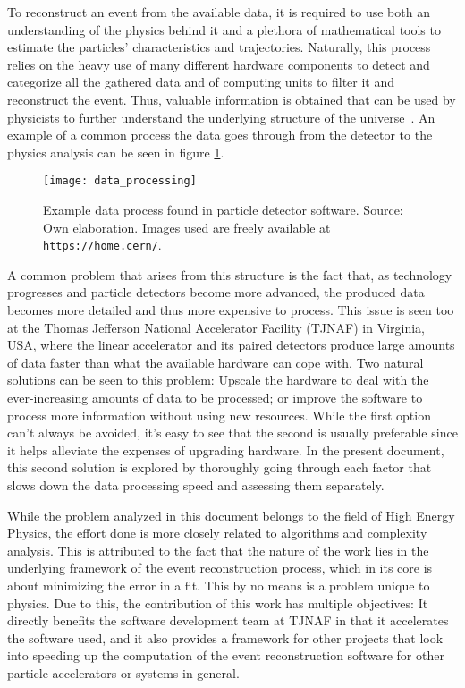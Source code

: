 To reconstruct an event from the available data, it is required to use both an understanding of the physics behind it and a plethora of mathematical tools to estimate the particles' characteristics and trajectories.
Naturally, this process relies on the heavy use of many different hardware components to detect and categorize all the gathered data and of computing units to filter it and reconstruct the event.
Thus, valuable information is obtained that can be used by physicists to further understand the underlying structure of the universe~\cite{sirunyan2017particle}.
An example of a common process the data goes through from the detector to the physics analysis can be seen in figure \ref{fig:data_processing}.

    \begin{figure}[ht]
        \centering
        \texttt{[image: data\_processing]}
        \caption{\label{fig:data_processing} Example data process found in particle detector software. Source: Own elaboration. Images used are freely available at \texttt{https://home.cern/}.}
    \end{figure}

A common problem that arises from this structure is the fact that, as technology progresses and particle detectors become more advanced, the produced data becomes more detailed and thus more expensive to process.
This issue is seen too at the Thomas Jefferson National Accelerator Facility (TJNAF) in Virginia, USA, where the linear accelerator and its paired detectors produce large amounts of data faster than what the available hardware can cope with. %
Two natural solutions can be seen to this problem: Upscale the hardware to deal with the ever-increasing amounts of data to be processed; or improve the software to process more information without using new resources.
While the first option can't always be avoided, it's easy to see that the second is usually preferable since it helps alleviate the expenses of upgrading hardware.
In the present document, this second solution is explored by thoroughly going through each factor that slows down the data processing speed and assessing them separately.


While the problem analyzed in this document belongs to the field of High Energy Physics, the effort done is more closely related to algorithms and complexity analysis.
This is attributed to the fact that the nature of the work lies in the underlying framework of the event reconstruction process, which in its core is about minimizing the error in a fit.
This by no means is a problem unique to physics.
Due to this, the contribution of this work has multiple objectives: It directly benefits the software development team at TJNAF in that it accelerates the software used, and it also provides a framework for other projects that look into speeding up the computation of the event reconstruction software for other particle accelerators or systems in general.

